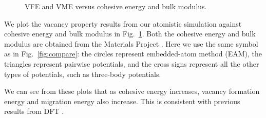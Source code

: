 \documentclass[%
 reprint,
 amsmath,amssymb,
 aps,
]{revtex4-1}
\begin{document}
\begin{figure}
\newline
\noindent\ignorespaces
{}\hfill
{}
\caption{\label{fig:vsenergy}
 VFE and VME versus cohesive energy and bulk modulus.
}
\end{figure}

We plot the vacancy property results from our atomistic simulation against cohesive energy and bulk modulus in Fig.~\ref{fig:vsenergy}.
Both the cohesive energy and bulk modulus are obtained from the Materials Project \cite{jain2013commentary,de2015charting}.
Here we use the same symbol as in Fig.~\ref{fig:compare}: the circles represent embedded-atom method (EAM), the triangles represent pairwise potentials, and the cross signs represent all the other types of potentials, such as three-body potentials.

We can see from these plots that as cohesive energy increases, vacancy formation energy and migration energy also increase.
This is consistent with previous results from DFT \cite{angsten2014elemental}.
\end{document}
